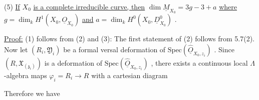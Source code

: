 
(5)  \underline{If} $X_0$ \underline{is a complete irreducible curve, then} $\dim \underline{M}_{X_0} = 3g - 3 + a$ \underline{where} $g = \dim_k H^1(X_0, \underline{O}_{X_0})$ \underline{and} $a = \dim_k H^0(X_0, \underline{D}^0_{X_0})$ .

\underline{Proof:}  (1) follows from (2) and (3): The first statement of (2) follows from 5.7(2). Now let $(R_i, \mathfrak{Y}_i)$ be a formal versal deformation of $\mathrm{Spec}(\hat{\underline{O}}_{X_0,z_i})$ . Since $(R, \mathfrak{X}_{(\mathfrak{z}_i)})$ is a deformation of $\mathrm{Spec}(\hat{\underline{O}}_{X_0,z_i})$ , there exists a continuous local $\Lambda$-algebra maps $\varphi_i = R_i \to R$ with a cartesian diagram

\begin{center}
\end{center}
Therefore we have

